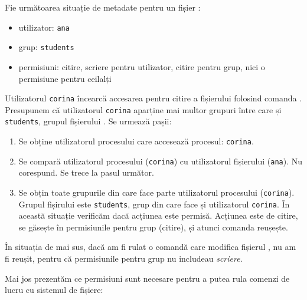 Fie următoarea situație de metadate pentru un fișier :

\begin{itemize}
  \item utilizator: \texttt{ana}
  \item grup: \texttt{students}
  \item permisiuni: citire, scriere pentru utilizator, citire pentru grup, nici o permisiune pentru ceilalți
\end{itemize}

Utilizatorul \texttt{corina} încearcă accesarea pentru citire a fișierului folosind comanda .
Presupunem că utilizatorul \texttt{corina} aparține mai multor grupuri între care și \texttt{students}, grupul fișierului .
Se urmează pașii:

\begin{enumerate}
  \item Se obține utilizatorul procesului care accesează procesul: \texttt{corina}.
  \item Se compară utilizatorul procesului (\texttt{corina}) cu utilizatorul fișierului (\texttt{ana}).
    Nu corespund.
    Se trece la pasul următor.
  \item Se obțin toate grupurile din care face parte utilizatorul procesului (\texttt{corina}).
    Grupul fișirului  este \texttt{students}, grup din care face și utilizatorul \texttt{corina}.
    În această situație verificăm dacă acțiunea este permisă.
    Acțiunea este de citire, se găsește în permisiunile pentru grup (citire), și atunci comanda  reușește.
\end{enumerate}

În situația de mai sus, dacă am fi rulat o comandă care modifica fișierul , nu am fi reușit, pentru că permisiunile pentru grup nu includeau \textit{scriere}.

Mai jos prezentăm ce permisiuni sunt necesare pentru a putea rula comenzi de lucru cu sistemul de fișiere:


